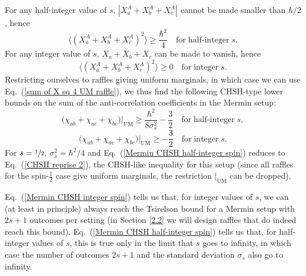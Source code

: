 For any half-integer value of $s$, $|X_a^A + X_b^A + X_c^A|$ cannot be made smaller than $\hbar/2$, hence
\begin{equation}
\langle \left( X_a^A + X_b^A + X_c^A \right)^{\!2} \rangle \ge \frac{\hbar^2}{4} \quad {\mathrm{for \; half}}\mbox{-}{\mathrm{integer \;}} s.
\label{De Finetti half integer s}
\end{equation}
For any integer value of $s$, $X_a + X_b + X_c$ can be made to vanish, hence
\begin{equation}
\langle \left( X_a^A + X_b^A + X_c^A \right)^{\!2} \rangle \ge 0 \quad {\mathrm{for \; integer \;}} s.
\label{De Finetti integer s}
\end{equation} 
Restricting ourselves to raffles giving uniform marginals, in which case we can use Eq.\ (\ref{sum of X sq 4 UM raffle}), we thus find the following CHSH-type lower bounds on the sum of the anti-correlation coefficients in the Mermin setup:
\begin{equation}
\big( \chi_{ab} + \chi_{ac} + \chi_{bc} \big)  \big|_{\mathrm{UM}} \ge \frac{\hbar^2}{8\sigma_s^2} - \frac32 \quad {\mathrm{for \; half}}\mbox{-}{\mathrm{integer \;}} s,
\label{Mermin CHSH half-integer spin}
\end{equation}
\begin{equation}
\big( \chi_{ab} + \chi_{ac} + \chi_{bc} \big)  \big|_{\mathrm{UM}}  \ge - \frac32 \quad {\mathrm{for \; integer \;}} s.
\label{Mermin CHSH integer spin}
\end{equation}
For $s=\sfrac12$, $\sigma_s^2 = \hbar^2/4$ and Eq.\ (\ref{Mermin CHSH half-integer spin}) reduces to Eq.\ (\ref{CHSH reprise 2}), the CHSH-like inequality for this setup (since all raffles for the spin-$\frac12$ case give uniform marginals, the restriction $\big|_{\mathrm{UM}}$ can be dropped).

Eq.\ (\ref{Mermin CHSH integer spin}) tells us that, for integer values of $s$, we can (at least in principle) always reach the Tsirelson bound for a Mermin setup with $2s+1$ outcomes per setting (in Section \ref{2.2} we will design raffles that do indeed reach this bound). Eq.\ (\ref{Mermin CHSH half-integer spin}) tells us that, for half-integer values of $s$, this is true only in the limit that $s$ goes to infinity, in which case the number of outcomes $2s+1$ and the standard deviation $\sigma_s$ also go to infinity. 

